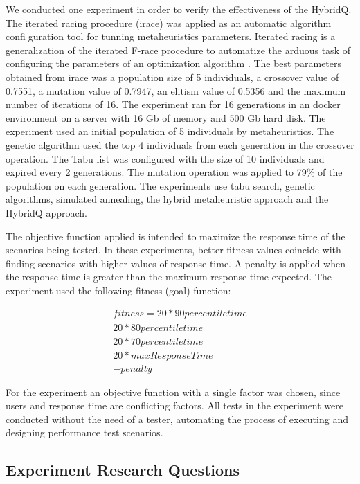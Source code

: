 \documentclass[espaco=umemeio,chapter=TITLE,twoside,openright]{abnt}
\begin{document}
We conducted one experiment in order to verify the effectiveness of the HybridQ. The iterated racing procedure (irace) was applied as an automatic algorithm configuration tool for tunning metaheuristics parameters. Iterated racing is a generalization of the iterated F-race procedure to automatize the arduous task of configuring the parameters of an optimization algorithm \cite{ManuelLopez-IbanezJeremieDubois-LacosteLesliePerezCaceresMauroBirattari2016}. The best parameters obtained from irace was a population size of 5 individuals, a crossover value of 0.7551, a mutation value of 0.7947, an elitism value of 0.5356 and the maximum number of iterations of 16. The experiment ran for 16 generations in an docker environment on a server with 16 Gb of memory and 500 Gb hard disk. The experiment used an initial population of 5 individuals by metaheuristics. The genetic algorithm used the top 4 individuals from each generation in the crossover operation. The Tabu list was configured with the size of 10 individuals and expired every 2 generations.  The mutation operation was applied to 79\% of the population on each generation. The experiments use tabu search, genetic algorithms, simulated annealing, the hybrid metaheuristic approach and the HybridQ approach. 


The objective function applied is intended to maximize the response time of the scenarios being tested.  In these experiments, better fitness values coincide with finding scenarios with higher values of response time. A penalty is applied when the response time is greater than the  maximum response time expected. The experiment used the following fitness (goal) function:

\begin{equation}
\begin{aligned}
fitness=
20* 90percentiletime\\
20*80percentiletime\\
20*70percentiletime\\
20*maxResponseTime\\
-penalty
\end{aligned}
\end{equation}

For the experiment an objective function with a single factor was chosen, since users and response time are conflicting factors. All tests in the experiment were conducted without the need of a tester, automating the process of executing and designing performance test scenarios.    

\subsection{Experiment Research Questions}
\end{document}
